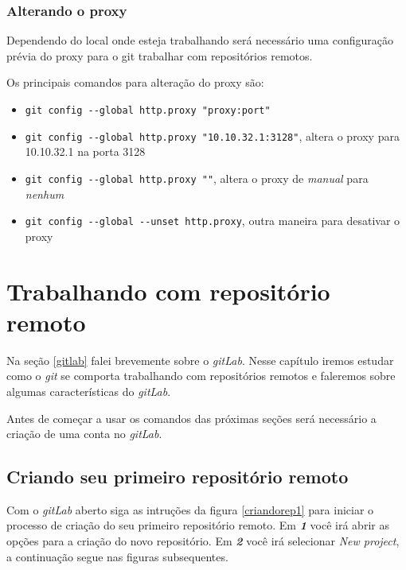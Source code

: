 \documentclass[12pt,openright,oneside,a4paper,english,brazil]{abntex2}
\begin{document}
\subsection{Alterando o proxy \label{alterandoproxy}}

Dependendo do local onde esteja trabalhando será necessário uma configuração prévia do proxy para o git trabalhar com repositórios remotos. 

Os principais comandos para alteração do proxy são:

\begin{itemize}
	\item \verb|git config --global http.proxy "proxy:port"|
	\item \verb|git config --global http.proxy "10.10.32.1:3128"|, altera o proxy para  10.10.32.1 na porta 3128
	\item \verb|git config --global http.proxy ""|, altera o proxy de \textit{manual} para \textit{nenhum}
	\item  \verb|git config --global --unset http.proxy|, outra maneira para desativar o proxy
\end{itemize}


\chapter{Trabalhando com repositório remoto}

Na seção \ref{gitlab} falei brevemente sobre o \textit{gitLab}. Nesse capítulo iremos estudar como o \textit{git} se comporta trabalhando com repositórios remotos e faleremos sobre algumas características do \textit{gitLab}.

Antes de começar a usar os comandos das próximas seções será necessário a criação de uma conta no \textit{gitLab}.

\section{Criando seu primeiro repositório remoto}

Com o \textit{gitLab} aberto siga as intruções da figura \ref{criandorep1} para iniciar o processo de criação do seu primeiro repositório remoto. Em \textbf{\textit{1}} você irá abrir as opções para a criação do novo repositório. Em \textbf{\textit{2}} você irá selecionar \textit{New project}, a continuação segue nas figuras subsequentes.
\end{document}
